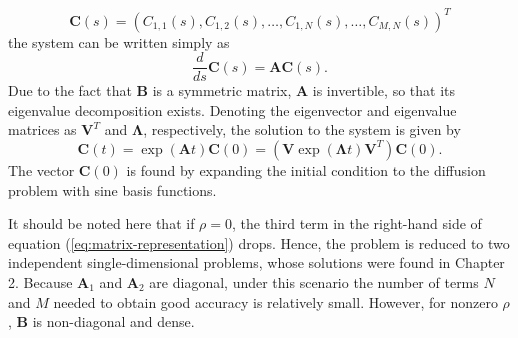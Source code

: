 \[ \mathbf{C}(s) = (C_{1,1}(s), C_{1,2}(s), \ldots, C_{1,N}(s), \ldots, C_{M,N}(s) )^T \]
the system can be written simply as 
\[ \frac{d}{ds} \mathbf{C}(s) = \mathbf{A} \mathbf{C}(s). \]
Due to the fact that $\mathbf{B}$ is a symmetric matrix, $\mathbf{A}$ is invertible, so that its eigenvalue decomposition exists. Denoting the eigenvector and eigenvalue matrices as $\mathbf{V}^T$ and $\boldsymbol{\Lambda}$, respectively, the solution to the system is given by 
\[ \mathbf{C}(t) = \exp(\mathbf{A}t)\mathbf{C}(0) = \left( \mathbf{V} \exp(\boldsymbol{\Lambda}t) \mathbf{V}^T \right) \mathbf{C}(0). \]
The vector $\mathbf{C}(0)$ is found by expanding the initial condition to the diffusion problem with sine basis functions. 

It should be noted here that if $\rho = 0$, the third term in the right-hand side of equation (\ref{eq:matrix-representation}) drops. Hence, the problem is reduced to two independent single-dimensional problems, whose solutions were found in Chapter 2. Because $\mathbf{A}_1$ and $\mathbf{A}_2$ are diagonal, under this scenario the number of terms $N$ and $M$ needed to obtain good accuracy is relatively small. However, for nonzero $\rho$, $\mathbf{B}$ is non-diagonal and dense.


